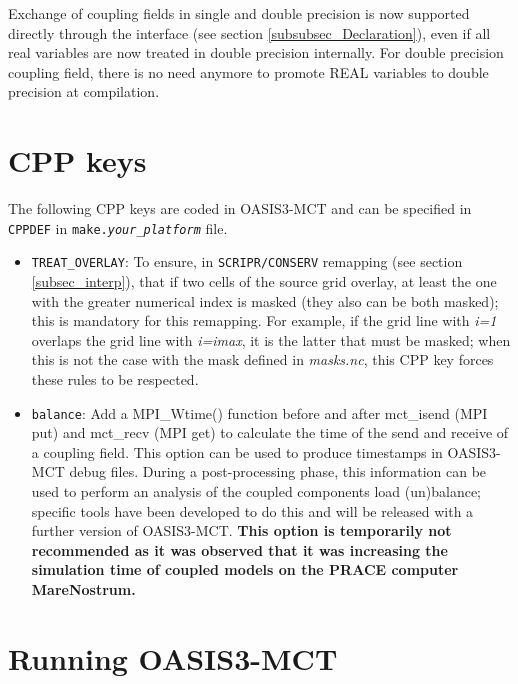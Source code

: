Exchange of coupling fields in single and double precision is now supported directly through the interface 
(see section \ref{subsubsec_Declaration}), even if all real variables are now treated in double precision internally.
For double precision coupling field, there is no need anymore to promote REAL variables to double precision at compilation.

\section{CPP keys}
\label{subsec_cpp}

The following CPP keys are coded in OASIS3-MCT and can be specified in
{\tt CPPDEF} in {\tt make.{\it your\_platform}} file.

\begin{itemize}

\item {\tt TREAT\_OVERLAY}: To ensure, in {\tt SCRIPR/CONSERV}
  remapping (see section \ref{subsec_interp}), that if two cells of
  the source grid overlay, at least the one with the greater numerical
  index is masked (they also can be both masked); this is mandatory
  for this remapping. For example, if the grid line with {\it i=1} overlaps
  the grid line with {\it i=imax}, it is the latter that must be masked;
  when this is not the case with the mask defined in {\it masks.nc},
  this CPP key forces these rules to be respected.

\item {\tt balance}: Add a MPI\_Wtime() function before and after
  mct\_isend (MPI put) and mct\_recv (MPI get) to calculate the time
  of the send and receive of a coupling field. This option can be used
  to produce timestamps in OASIS3-MCT debug files. During a post-processing
  phase, this information can be used to perform an analysis of the
  coupled components load (un)balance; specific tools have been
  developed to do this and will be released with a further version of
  OASIS3-MCT. {\bf This option is temporarily not recommended as it was observed that
  it was increasing the simulation time of coupled models on
  the PRACE computer MareNostrum.}

\end{itemize}

\section{Running OASIS3-MCT}
\label{subsec_running}

